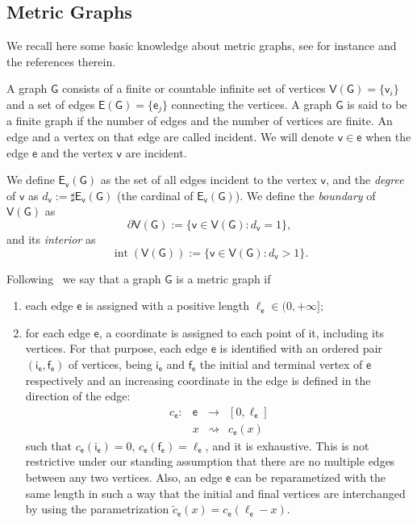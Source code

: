 \documentclass[reqno,12pt]{amsart}
\def\e{\mathsf{e}} 	%
\def\v{\mathsf{v}}	%
\newcommand{\vi}{\mathsf{i}} %
\newcommand{\vf}{\mathsf{f}} %
\newcommand{\G}{\mathsf{G}}	%
\newcommand{\V}{\mathsf{V}}	%
\newcommand{\E}{\mathsf{E}}	%
\numberwithin{equation}{section} %
\begin{document}
 \subsection{Metric Graphs}\label{sec1747}

We  recall here some basic knowledge about metric graphs,
see for instance
\cite{BerKuc13} and  the references therein.

A graph $\G$ consists of a finite or countable infinite set
of vertices $\V(\G)=\{\v_i\}$ and a set of edges $\E(\G)=\{\e_j\}$ connecting the
vertices.  A graph $\G$ is said to be a finite graph if the number of edges
and the number of vertices are finite.
 An edge and a vertex on
that edge are called incident. We will denote $\v\in \e$ when the edge $\e$ and the vertex $\v$ are incident.



We define $\E_{\v}(\G)$ as the set of all edges incident to the vertex $\v$, and the {\it degree} of $\v$ as $d_\v:=  \sharp \E_{\v}(\G)$ (the cardinal of $\E_\v(\G)$). We define the {\it boundary} of $\V(\G)$ as
$$\partial \V(\G):= \{ \v \in \V(\G)   :   d_\v =1 \},$$
 and its {\it interior} as
 $$\operatorname{int}(\V(\G)) := \{ \v \in \V(\G)   :   d_\v > 1 \}.$$



  Following~\cite{BerKuc13} we say that a  graph $\G$ is a metric graph if
\begin{enumerate}
	\item each edge $\e$ is assigned  with a positive length $\ell_{\e}\in(0,+\infty];$
	

\item   for each edge $\e$, a coordinate is assigned to each point of it, including its vertices. For that purpose, each edge $\e$ is  identified with an ordered pair
$(\vi_{\e},\vf_{\e})$ of vertices, being $\vi_{\e}$ and $\vf_{\e}$ the
initial and terminal vertex of $\e$ respectively
and an increasing coordinate in the edge is defined in the direction of the edge:  
	$$
	\begin{array}{rlcc}
 c_\e:&\e&\to& [0,\ell_\e]\\
 &x&\rightsquigarrow& c_\e(x)
 \end{array}
$$
such that $c_\e(\vi_\e)=0$, $c_\e(\vf_\e)=\ell_{\e}$, and it is exhaustive.  This is not restrictive under our standing assumption that there are no multiple edges between any two vertices. Also, an edge $\e$ can be reparametized with the same length in such a way that the initial and final vertices are interchanged by using the parametrization $\tilde c_\e(x)=c_\e(\ell_\e-x)$.
\end{enumerate}
\end{document}
